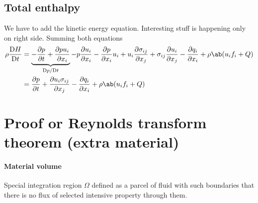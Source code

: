 \documentclass[justified, nobib,a4paper]{tufte-handout}
\begin{document}
\subsection{Total enthalpy}
We have to add the kinetic energy equation. Interesting stuff is happening only on right side.
Summing both equations
\[
  \begin{split}
    \rho\mdv{H}{t} &= \underbrace{-\pdv{p}{t} + \pdv{p u_i}{x_i}}_{\mdv{p}/{t}} 
    -p\pdv{ u_i}{x_i} - \pdv{p}{x_i}u_i + u_i\pdv{\sigma_{ij}}{x_j} + \sigma_{ij}\pdv{u_i}{x_j} - \pdv{q_i}{x_i}
    + \rho\ab(u_i f_i + Q)\\
    &= \pdv{p}{t} + \pdv{u_i \sigma_{ij}}{x_j} - \pdv{q_i}{x_i}
    + \rho\ab(u_i f_i + Q)
  \end{split}
\]


\section{Proof or Reynolds transform theorem (extra material)}


\paragraph{Material volume}
Special integration region \(\Omega\) defined as a parcel of fluid
with such boundaries that there is no flux of selected intensive property 
through them.
\end{document}
